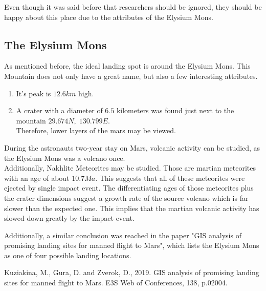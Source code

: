 \documentclass{article}
\begin{document}
Even though it was said before that researchers should be ignored, they should be happy about this place due to the attributes of the Elysium Mons.

\subsection{The Elysium Mons}
As mentioned before, the ideal landing spot is around the Elysium Mons.
This Mountain does not only have a great name, but also a few interesting attributes.
\begin{enumerate}
    \item It's peak is \(12.6km\) high.
    \item A crater with a diameter of \(6.5\) kilometers was found just next to the mountain \(29.674N, \; 130.799E\). \\ Therefore, lower layers of the mars may be viewed.
\end{enumerate}

During the astronauts two-year stay on Mars, volcanic activity can be studied, as the Elysium Mons was a volcano once.
\\
Additionally, Nakhlite Meteorites may be studied. 
Those are martian meteorites with an age of about \(10.7 Ma\).
This suggests that all of these meteorites were ejected by single impact event.
The differentiating ages of those meteorites plus the crater dimensions suggest a growth rate of the source volcano which is far slower than the expected one.
This implies that the martian volcanic activity has slowed down greatly by the impact event.

Additionally, a similar conclusion was reached in the paper "GIS analysis of promising landing sites for manned flight to Mars", which lists the Elysium Mons as one of four possible landing locations. \cite{dmtri}


\begin{thebibliography}{1}
    Kuziakina, M., Gura, D. and Zverok, D., 2019. GIS analysis of promising landing sites for manned flight to Mars. E3S Web of Conferences, 138, p.02004.
\end{thebibliography}
    
\end{document}
